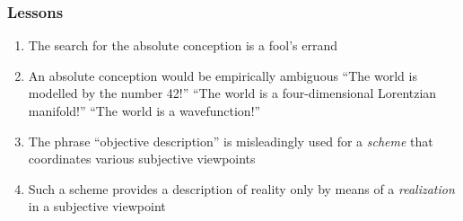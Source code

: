 \documentclass{beamer}
\begin{document}
\begin{frame}
  \frametitle{Lessons}
  \begin{enumerate}
  \item The search for the absolute conception is a fool's errand
  \item An absolute conception would be empirically ambiguous \newline
    ``The world is modelled by the number 42!''  \newline ``The world
    is a four-dimensional Lorentzian manifold!'' \newline ``The world
    is a wavefunction!''
  \item The phrase ``objective description'' is misleadingly used for
    a \emph{scheme} that coordinates various subjective viewpoints
  \item Such a scheme provides a description of reality only by means
    of a \emph{realization} in a subjective viewpoint
  \end{enumerate}
  \end{frame}
\end{document}
